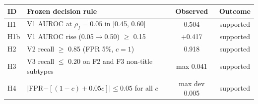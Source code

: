 \begin{tabular}{@{}llcc@{}}
\toprule
ID & Frozen decision rule & Observed & Outcome \\
\midrule
H1 & V1 AUROC at $\rho_f{=}0.05$ in [0.45, 0.60] & 0.504 & supported \\
H1b & V1 AUROC rise (0.05$\to$0.50) $\geq$ 0.15 & +0.417 & supported \\
H2 & V2 recall $\geq$ 0.85 (FPR 5\%, $c{=}1$) & 0.918 & supported \\
H3 & V3 recall $\leq$ 0.20 on F2 and F3 non-title subtypes & max 0.041 & supported \\
H4 & $|$FPR$-[(1{-}c){+}0.05c]|\leq 0.05$ for all $c$ & max dev 0.005 & supported \\
\bottomrule
\end{tabular}